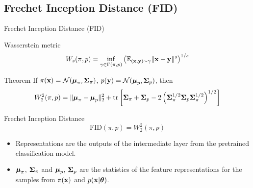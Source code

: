 \subsection{Frechet Inception Distance (FID)}
\begin{frame}{Frechet Inception Distance (FID)}
	\begin{block}{Wasserstein metric}
		\vspace{-0.2cm}
		\[
		W_s(\pi, p) = \inf_{\gamma \in \Gamma(\pi, p)} \left(\mathbb{E}_{(\mathbf{x}, \mathbf{y}) \sim \gamma} \| \mathbf{x} - \mathbf{y} \|^s\right)^{1/s}
		\]
		\vspace{-0.6cm}
	\end{block}
	\begin{block}{Theorem}
		If $\pi(\mathbf{x}) = \mathcal{N}(\boldsymbol{\mu}_\pi, \boldsymbol{\Sigma}_\pi)$, $p(\mathbf{y}) = \mathcal{N}(\boldsymbol{\mu}_p, \boldsymbol{\Sigma}_p)$, then
		\vspace{-0.3cm}
		\[
		W_2^2(\pi, p) = \| \boldsymbol{\mu}_{\pi} - \boldsymbol{\mu}_{p}\|_2^2 + \text{tr} \left[ \boldsymbol{\Sigma}_{\pi} + \boldsymbol{\Sigma}_p - 2 \left(\boldsymbol{\Sigma}_{\pi}^{1/2} \boldsymbol{\Sigma}_p \boldsymbol{\Sigma}_{\pi}^{1/2} \right)^{1/2} \right]
		\]
		\vspace{-0.7cm}
	\end{block}
	\begin{block}{Frechet Inception Distance}
		\vspace{-0.3cm}
		\[
			\text{FID} (\pi, p) =  W_2^2(\pi, p)
		\]
		\vspace{-0.6cm}
	\end{block}
	\begin{itemize}
		\item Representations are the outputs of the intermediate layer from the pretrained classification model.
		\item $\boldsymbol{\mu}_{\pi}$, $\boldsymbol{\Sigma}_{\pi}$ and $\boldsymbol{\mu}_{p}$, $\boldsymbol{\Sigma}_p$ are the statistics of the feature representations for the samples from $\pi(\mathbf{x})$ and $p(\mathbf{x} | \boldsymbol{\theta})$.
	\end{itemize}
\end{frame}
